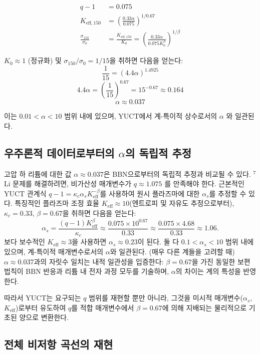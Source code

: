 \documentclass[11pt,a4paper]{article}
\newcommand{\Ke}{K_{\mathrm{eff}}}
\newcommand{\kappac}{\kappa_c}
\newcommand{\alp}{\alpha}
\theoremstyle{remark}
\begin{document}
	\begin{align}
		q - 1 &= 0.075 \nonumber \\
		K_{\mathrm{eff},150} &= \left( \frac{0.33 \alp}{0.075} \right)^{1/0.67} \nonumber \\
		\frac{\sigma_{150}}{\sigma_0} &= \frac{K_{\mathrm{eff},150}}{K_0} = \left( \frac{0.33 \alp}{0.075 K_0^{\beta}} \right)^{1/\beta} \label{eq:calibration}
	\end{align}
	
	\(K_0 \approx 1\) (정규화) 및 \(\sigma_{150}/\sigma_0 = 1/15\)을 취하면 다음을 얻는다:
	\[
	\frac{1}{15} = \left( 4.4 \alp \right)^{1.4925}
	\]
	\[
	4.4 \alp = \left( \frac{1}{15} \right)^{0.67} = 15^{-0.67} \approx 0.164
	\]
	\[
	\alp \approx 0.037
	\]
	
	이는 \(0.01 < \alp < 10\) 범위 내에 있으며, YUCT에서 계-특이적 상수로서의 \(\alp\) \cite{appendixC}와 일관된다.
	
	\subsection{우주론적 데이터로부터의 \(\alp\)의 독립적 추정}
	\label{subsec:alpha_cosmo}
	
	고압 하 리튬에 대한 값 \(\alp \approx 0.037\)은 BBN으로부터의 독립적 추정과 비교될 수 있다. \(^7\)Li 문제를 해결하려면, 비가산성 매개변수가 \(q \approx 1.075\) \cite{bertulani2015}를 만족해야 한다. 근본적인 YUCT 관계식 \(q-1 = \kappac \alp_s \Ke^{-\beta}\)를 사용하여 원시 플라즈마에 대한 \(\alp_s\)를 추정할 수 있다. 특징적인 플라즈마 조정 효율 \(\Ke \approx 10\)(엔트로피 및 자유도 추정으로부터), \(\kappac = 0.33\), \(\beta = 0.67\)을 취하면 다음을 얻는다:
	\[
	\alp_s = \frac{(q-1)\Ke^{\beta}}{\kappac} \approx \frac{0.075 \times 10^{0.67}}{0.33} \approx \frac{0.075 \times 4.68}{0.33} \approx 1.06.
	\]
	보다 보수적인 \(\Ke \approx 3\)을 사용하면 \(\alp_s \approx 0.23\)이 된다. 둘 다 \(0.1 < \alp_s < 10\) 범위 내에 있으며, 계-특이적 매개변수로서의 \(\alp\)와 일관된다. (매우 다른 계들을 고려할 때) \(\alp \approx 0.037\)과의 자릿수 일치는 내적 일관성을 입증한다: \(\beta = 0.67\)을 가진 동일한 보편 법칙이 BBN 반응과 리튬 내 전자 과정 모두를 기술하며, \(\alp\)의 차이는 계의 특성을 반영한다.
	
	따라서 YUCT는 요구되는 \(q\) 범위를 재현할 뿐만 아니라, 그것을 미시적 매개변수(\(\alp_s\), \(\Ke\))로부터 유도하여 \(q\)를 적합 매개변수에서 \(\beta = 0.67\)에 의해 지배되는 물리적으로 기초된 양으로 변환한다.
	
	\subsection{전체 비저항 곡선의 재현}
	
\end{document}

